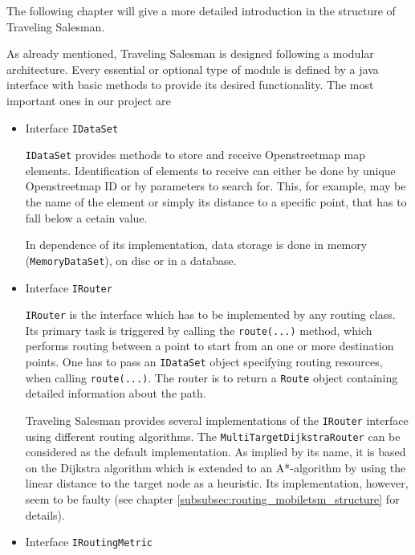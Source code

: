 The following chapter will give a more detailed introduction in the structure of Traveling Salesman.\newline

As already mentioned, Traveling Salesman is designed following a modular architecture. Every essential or optional type of module is defined by a java interface with basic methods to provide its desired functionality. The most important ones in our project are

\begin{itemize}

	\item Interface \texttt{IDataSet}
	
		\texttt{IDataSet} provides methods to store and receive Openstreetmap map elements. Identification of elements to receive can either be done by unique Openstreetmap ID or by parameters to search for. This, for example, may be the name of the element or simply its distance to a specific point, that has to fall below a cetain value.\newline

		 In dependence of its implementation, data storage is done in memory (\texttt{MemoryDataSet}), on disc or in a database.
	
	\item Interface \texttt{IRouter}

		\texttt{IRouter} is the interface which has to be implemented by any routing class. Its primary task is triggered by calling the \texttt{route(...)} method, which performs routing between a point to start from an one or more destination points. One has to pass an \texttt{IDataSet} object specifying routing resources, when calling \texttt{route(...)}. The router is to return a \texttt{Route} object containing detailed information about the path.\newline
		
		Traveling Salesman provides several implementations of the \texttt{IRouter} interface using different routing algorithms. The \texttt{MultiTargetDijkstraRouter} can be considered as the default implementation. As implied by its name, it is based on the Dijkstra algorithm which is extended to an A*-algorithm by using the linear distance to the target node as a heuristic. Its implementation, however, seem to be faulty (see chapter \ref{subsubsec:routing_mobiletsm_structure} for details).
			
	\item Interface \texttt{IRoutingMetric}
	

\end{itemize}
